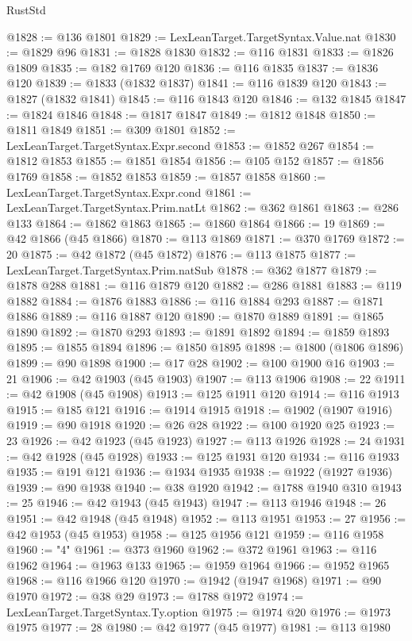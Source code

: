 \begin{lexlean}{RustStd}
\begin{coremodule}
@1828 := @136 @1801
@1829 := LexLeanTarget.TargetSyntax.Value.nat
@1830 := @1829 @96
@1831 := @1828 @1830
@1832 := @116 @1831
@1833 := @1826 @1809
@1835 := @182 @1769 @120
@1836 := @116 @1835
@1837 := @1836 @120
@1839 := @1833 (@1832 @1837)
@1841 := @116 @1839 @120
@1843 := @1827 (@1832 @1841)
@1845 := @116 @1843 @120
@1846 := @132 @1845
@1847 := @1824 @1846
@1848 := @1817 @1847
@1849 := @1812 @1848
@1850 := @1811 @1849
@1851 := @309 @1801
@1852 := LexLeanTarget.TargetSyntax.Expr.second
@1853 := @1852 @267
@1854 := @1812 @1853
@1855 := @1851 @1854
@1856 := @105 @152
@1857 := @1856 @1769
@1858 := @1852 @1853
@1859 := @1857 @1858
@1860 := LexLeanTarget.TargetSyntax.Expr.cond
@1861 := LexLeanTarget.TargetSyntax.Prim.natLt
@1862 := @362 @1861
@1863 := @286 @133
@1864 := @1862 @1863
@1865 := @1860 @1864
@1866 := 19
@1869 := @42 @1866 (@45 @1866)
@1870 := @113 @1869
@1871 := @370 @1769
@1872 := 20
@1875 := @42 @1872 (@45 @1872)
@1876 := @113 @1875
@1877 := LexLeanTarget.TargetSyntax.Prim.natSub
@1878 := @362 @1877
@1879 := @1878 @288
@1881 := @116 @1879 @120
@1882 := @286 @1881
@1883 := @119 @1882
@1884 := @1876 @1883
@1886 := @116 @1884 @293
@1887 := @1871 @1886
@1889 := @116 @1887 @120
@1890 := @1870 @1889
@1891 := @1865 @1890
@1892 := @1870 @293
@1893 := @1891 @1892
@1894 := @1859 @1893
@1895 := @1855 @1894
@1896 := @1850 @1895
@1898 := @1800 (@1806 @1896)
@1899 := @90 @1898
@1900 := @17 @28
@1902 := @100 @1900 @16
@1903 := 21
@1906 := @42 @1903 (@45 @1903)
@1907 := @113 @1906
@1908 := 22
@1911 := @42 @1908 (@45 @1908)
@1913 := @125 @1911 @120
@1914 := @116 @1913
@1915 := @185 @121
@1916 := @1914 @1915
@1918 := @1902 (@1907 @1916)
@1919 := @90 @1918
@1920 := @26 @28
@1922 := @100 @1920 @25
@1923 := 23
@1926 := @42 @1923 (@45 @1923)
@1927 := @113 @1926
@1928 := 24
@1931 := @42 @1928 (@45 @1928)
@1933 := @125 @1931 @120
@1934 := @116 @1933
@1935 := @191 @121
@1936 := @1934 @1935
@1938 := @1922 (@1927 @1936)
@1939 := @90 @1938
@1940 := @38 @1920
@1942 := @1788 @1940 @310
@1943 := 25
@1946 := @42 @1943 (@45 @1943)
@1947 := @113 @1946
@1948 := 26
@1951 := @42 @1948 (@45 @1948)
@1952 := @113 @1951
@1953 := 27
@1956 := @42 @1953 (@45 @1953)
@1958 := @125 @1956 @121
@1959 := @116 @1958
@1960 := "4"
@1961 := @373 @1960
@1962 := @372 @1961
@1963 := @116 @1962
@1964 := @1963 @133
@1965 := @1959 @1964
@1966 := @1952 @1965
@1968 := @116 @1966 @120
@1970 := @1942 (@1947 @1968)
@1971 := @90 @1970
@1972 := @38 @29
@1973 := @1788 @1972
@1974 := LexLeanTarget.TargetSyntax.Ty.option
@1975 := @1974 @20
@1976 := @1973 @1975
@1977 := 28
@1980 := @42 @1977 (@45 @1977)
@1981 := @113 @1980

\end{coremodule}
\end{lexlean}
